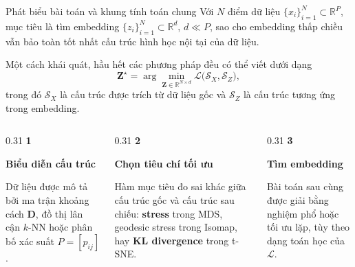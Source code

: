 \begin{frame}[shrink=12]{Phát biểu bài toán và khung tính toán chung}
    Với $N$ điểm dữ liệu $\{x_i\}_{i=1}^N \subset \mathbb{R}^{P}$, mục tiêu là tìm embedding $\{z_i\}_{i=1}^N \subset \mathbb{R}^{d}$, $d \ll P$, sao cho embedding thấp chiều vẫn bảo toàn tốt nhất cấu trúc hình học nội tại của dữ liệu.

    \vspace{0.18cm}
    Một cách khái quát, hầu hết các phương pháp đều có thể viết dưới dạng
    \[
        \mathbf{Z}^{\star}
        =
        \arg\min_{\mathbf{Z}\in\mathbb{R}^{N\times d}}
        \mathcal{L}\big(\mathcal{S}_X,\mathcal{S}_Z\big),
    \]
    trong đó $\mathcal{S}_X$ là cấu trúc được trích từ dữ liệu gốc và $\mathcal{S}_Z$ là cấu trúc tương ứng trong embedding.

    \vspace{0.18cm}
    \begin{columns}[T]
        \begin{column}{0.31\textwidth}
            {\large\textcolor{your_color}{\textbf{1}}}

            {\bfseries Biểu diễn cấu trúc}

            Dữ liệu được mô tả bởi ma trận khoảng cách $\mathbf{D}$, đồ thị lân cận $k$-NN hoặc phân bố xác suất $P=[p_{ij}]$.
        \end{column}

        \begin{column}{0.31\textwidth}
            {\large\textcolor{your_color}{\textbf{2}}}

            {\bfseries Chọn tiêu chí tối ưu}

            Hàm mục tiêu đo sai khác giữa cấu trúc gốc và cấu trúc sau chiếu: \textbf{stress} trong MDS, geodesic stress trong Isomap, hay \textbf{KL divergence} trong t-SNE.
        \end{column}

        \begin{column}{0.31\textwidth}
            {\large\textcolor{your_color}{\textbf{3}}}

            {\bfseries Tìm embedding}

            Bài toán sau cùng được giải bằng nghiệm phổ hoặc tối ưu lặp, tùy theo dạng toán học của $\mathcal{L}$.
        \end{column}
    \end{columns}
\end{frame}

